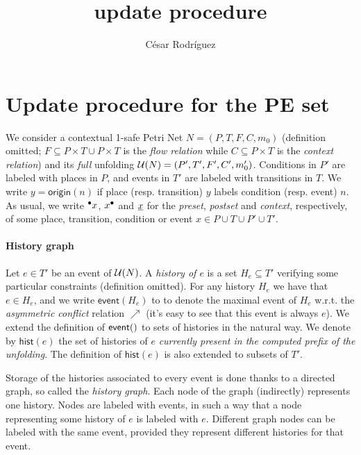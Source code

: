 \documentclass[11pt]{article}
\title{\pe{} update procedure}
\author{César Rodríguez}
\newcommand{\event}[1]{\ensuremath{\mathsf{event}(#1)}}
\newcommand{\hist}[1]{\ensuremath{\mathsf{hist}(#1)}}
\newcommand{\origin}[1]{\ensuremath{\mathsf{origin}(#1)}}
\newcommand{\pe}{{\sc PE}}
\begin{document}
\maketitle

\section{Update procedure for the \pe{} set}

We consider a contextual 1-safe Petri Net $N = (P, T, F, C, m_0)$ (definition
omitted; $F \subseteq P \times T \cup P \times T$ is the \emph{flow relation}
while $C \subseteq P \times T$ is the \emph{context relation}) and its
\emph{full} unfolding $\mathcal{U}(N) = (P', T', F', C', m_0')$.  Conditions in $P'$
are labeled with places in $P$, and events in $T'$ are labeled with transitions
in $T$.  We write $y = \origin{n}$ if place (resp. transition) $y$ labels
condition (resp. event) $n$.  As usual, we write ${}^\bullet x$, $x^\bullet$ and
$\underline{x}$ for the \emph{preset}, \emph{postset} and \emph{context},
respectively, of some place, transition, condition or event $x \in P \cup T
\cup P' \cup T'$.

\paragraph{History graph} Let $e \in T'$ be an event of $\mathcal{U}(N)$.  A
\emph{history of $e$} is a set $H_e \subseteq T'$ verifying some particular
constraints (definition omitted).  For any history $H_e$ we have that $e \in
H_e$, and we write $\event{H_e}$ to to denote the maximal event of $H_e$ w.r.t.
the \emph{asymmetric conflict} relation $\nearrow$ (it's easy to see that this
event is always $e$).  We extend the definition of $\event$ to sets of
histories in the natural way.  We denote by $\hist{e}$ the set of histories of
$e$ \emph{currently present in the computed prefix of the unfolding}.  The
definition of $\hist{e}$ is also extended to subsets of $T'$.

Storage of the histories associated to every event is done thanks to a directed
graph, so called the \emph{history graph}.  Each node of the graph (indirectly)
represents one history.  Nodes are labeled with events, in such a way that a
node representing some history of $e$ is labeled with $e$.  Different graph
nodes can be labeled with the same event, provided they represent different
histories for that event.
\end{document}
